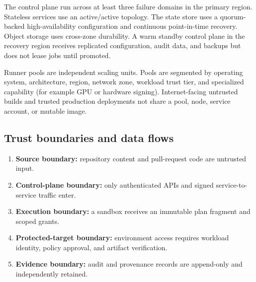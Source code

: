 The control plane \must run across at least three failure domains in the primary
region. Stateless services use an active/active topology. The state store uses a
quorum-backed high-availability configuration and continuous point-in-time recovery.
Object storage uses cross-zone durability. A warm standby control plane in the
recovery region receives replicated configuration, audit data, and backups but does
not lease jobs until promoted.

Runner pools are independent scaling units. Pools are segmented by operating system,
architecture, region, network zone, workload trust tier, and specialized capability
(for example GPU or hardware signing). Internet-facing untrusted builds and trusted
production deployments \must not share a pool, node, service account, or mutable image.

\subsection{Trust boundaries and data flows}

\begin{enumerate}
  \item \textbf{Source boundary:} repository content and pull-request code are untrusted input.
  \item \textbf{Control-plane boundary:} only authenticated APIs and signed service-to-service traffic enter.
  \item \textbf{Execution boundary:} a sandbox receives an immutable plan fragment and scoped grants.
  \item \textbf{Protected-target boundary:} environment access requires workload identity, policy approval, and artifact verification.
  \item \textbf{Evidence boundary:} audit and provenance records are append-only and independently retained.
\end{enumerate}

